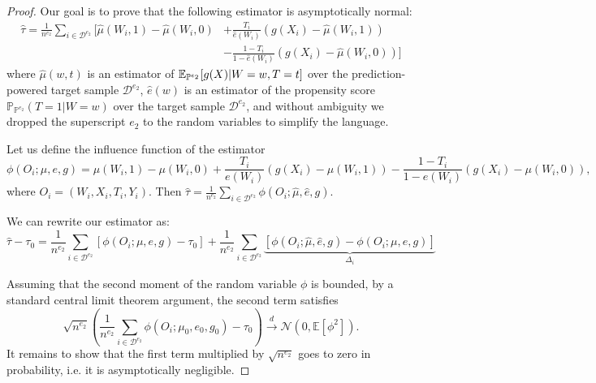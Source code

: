 \begin{proof}
Our goal is to prove that the following estimator is asymptotically normal:
\begin{equation*}
\begin{split}
    \hat{\tau} = \frac{1}{n^{e_2}} \sum_{i \in \mathcal{D}^{e_2}} \Bigg[ \hat{\mu}(W_i, 1) - \hat{\mu}(W_i, 0) &+ \frac{T_i}{\hat{e}(W_i)}(g(X_i) - \hat{\mu}(W_i, 1)) \\&- \frac{1-T_i}{1-\hat{e}(W_i)}(g(X_i) - \hat{\mu}(W_i, 0)) \Bigg]
\end{split}
\end{equation*}
where $\hat{\mu}(w, t)$ is an estimator of $\mathbb{E}_{\mathbb{P}^{e_2}}[ g(X) |W=w, T=t]$ over the prediction-powered target sample $\mathcal{D}^{e_2}$, $\hat{e}(w)$ is an estimator of the propensity score $\mathbb{P}_{\mathbb{P}^{e_2}}(T=1|W=w)$ over the target sample $\mathcal{D}^{e_2}$, and without ambiguity we dropped the superscript $e_2$ to the random variables to simplify the language.

Let us define the influence function of the estimator $$\phi(O_i; \mu, e, g) = \mu(W_i, 1) - \mu(W_i, 0) + \frac{T_i}{e(W_i)}(g(X_i) - \mu(W_i, 1)) - \frac{1-T_i}{1-e(W_i)}(g(X_i) - \mu(W_i, 0)),$$ where $O_i = (W_i, X_i, T_i, Y_i)$. Then $\hat{\tau} = \frac{1}{n^{e_2}} \sum_{i \in \mathcal{D}^{e_2}} \phi(O_i; \hat{\mu}, \hat{e}, g)$.



We can rewrite our estimator as:
$$\hat{\tau} - \tau_0 =  \frac{1}{n^{e_2}} \sum_{i \in \mathcal{D}^{e_2}} \left[ \phi(O_i; \mu, e, g) - \tau_0 \right] + \frac{1}{n^{e_2}} \sum_{i \in \mathcal{D}^{e_2}} \underbrace{\left[ \phi(O_i; \hat{\mu}, \hat{e}, g) - \phi(O_i; \mu, e, g) \right]}_{\Delta_i} $$

Assuming that the second moment of the random variable $\phi$ is bounded, by a standard central limit theorem argument, the second term satisfies  $$\sqrt{n^{e_2}} \left( \frac{1}{n^{e_2}} \sum_{i \in \mathcal{D}^{e_2}} \phi(O_i; \mu_0, e_0, g_0) - \tau_0 \right) \xrightarrow{d} \mathcal{N}(0, \mathbb{E}[\phi^2]).$$ It remains to show that the first term multiplied by $\sqrt{n^{e_2}}$ goes to zero in probability, i.e. it is asymptotically negligible.


\end{proof}
